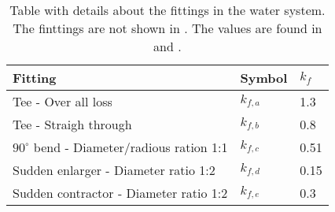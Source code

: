 \begin{table}[]
\centering
\begin{tabular}{l|l|l}
Fitting 									  & Symbol 	  & $k_f$   \\ \hline
Tee - Over all loss							  & $k_{f,a}$ & 1.3 	\\
Tee - Straigh through						  & $k_{f,b}$ & 0.8 	\\
$90^\circ$ bend - Diameter/radious ration 1:1 & $k_{f,c}$ & 0.51	\\
Sudden enlarger - Diameter ratio 1:2		  & $k_{f,d}$ & 0.15	\\
Sudden contractor - Diameter ratio 1:2		  & $k_{f,e}$ & 0.3 	
\end{tabular}
\caption{Table with details about the fittings in the water system. The finttings are not shown in . The values are found in \citep{Polypipe} and \citep{PEPS}.}
\label{tab:pip_detail}
\end{table}

